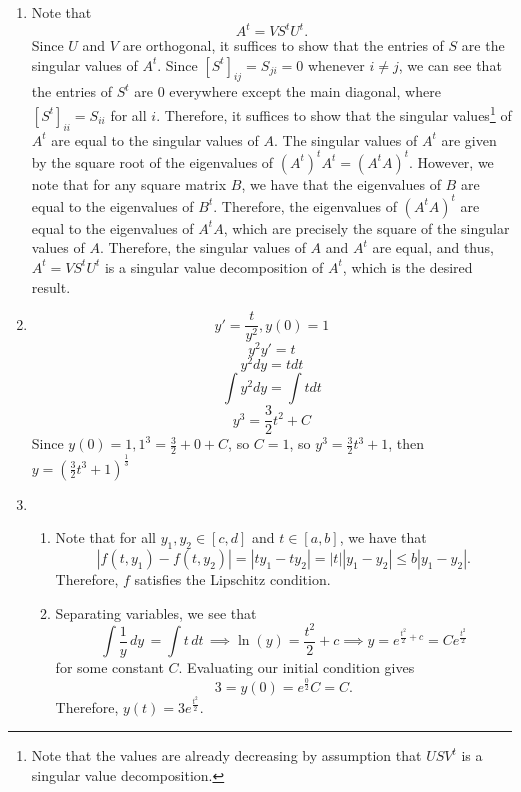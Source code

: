 \documentclass[12pt]{article}
\begin{document}
\begin{enumerate}[leftmargin=0em]
    \item
    Note that
    \[A^{t} = VS^{t}U^{t}.\]
    Since $U$ and $V$ are orthogonal, it suffices to show that the entries of $S$ are the singular values of $A^{t}$. Since ${[S^{t}]}_{ij} = S_{ji} = 0$ whenever $i\neq j$, we can see that the entries of $S^{t}$ are $0$ everywhere except the main diagonal, where ${[S^{t}]}_{ii} = S_{ii}$ for all $i$. Therefore, 
    it suffices to show that the singular values\footnote{Note that the values are already decreasing by assumption that $USV^{t}$ is a singular value decomposition.} of $A^{t}$ are equal to the singular values of $A$. The singular values of $A^{t}$ are given by the square root of the eigenvalues of ${(A^{t})}^{t}A^{t} = {(A^{t}A)}^{t}$. However, we note that for any square matrix $B$, we have that the eigenvalues of $B$ are equal to the eigenvalues of $B^{t}$. Therefore, the eigenvalues of ${(A^{t}A)}^{t}$ are equal to the eigenvalues of
    $A^{t}A$, which are precisely the square of the singular values of $A$. Therefore, the singular values of $A$ and $A^{t}$ are equal, and thus, $A^{t} = VS^{t}U^{t}$ is a singular value decomposition of $A^{t}$, which is the desired result.

    \item 
    \[y' = \frac{t}{y^2}, y(0) = 1\]
    \[y^2y' = t\]
    \[y^2dy = tdt\]
    \[\int y^2dy = \int tdt\]
    \[y^3 = \frac{3}{2}t^2 + C\]
    Since $y(0) = 1, 1^3 = \frac{3}{2} + 0 + C$, so $C = 1$, so $y^3 = \frac{3}{2}t^3+1$, then $y = (\frac{3}{2}t^{3}+1)^{\frac{1}{3}}$

    \item
    \begin{enumerate}[leftmargin=!]
        \item 
        Note that for all $y_1,y_2\in [c,d]$ and $t\in [a,b]$, we have that
        \[|f(t,y_1)-f(t,y_2)| = |ty_{1}-ty_{2}| = |t||y_{1}-y_{2}|\leq b|y_{1}-y_{2}|.\]
        Therefore, $f$ satisfies the Lipschitz condition.

        \item
        Separating variables, we see that
        \[\int\frac{1}{y}\, dy\, = \int t\, dt\, \implies \ln(y) = \frac{t^2}{2}+c \implies y = e^{\frac{t^2}{2}+c} = Ce^{\frac{t^2}{2}}\]
        for some constant $C$. Evaluating our initial condition gives
        \[3=y(0) = e^{\frac{0}{2}}C=C.\]
        Therefore, $y(t) = 3e^{\frac{t^2}{2}}$.


\end{enumerate}
\end{enumerate}
\end{document}
